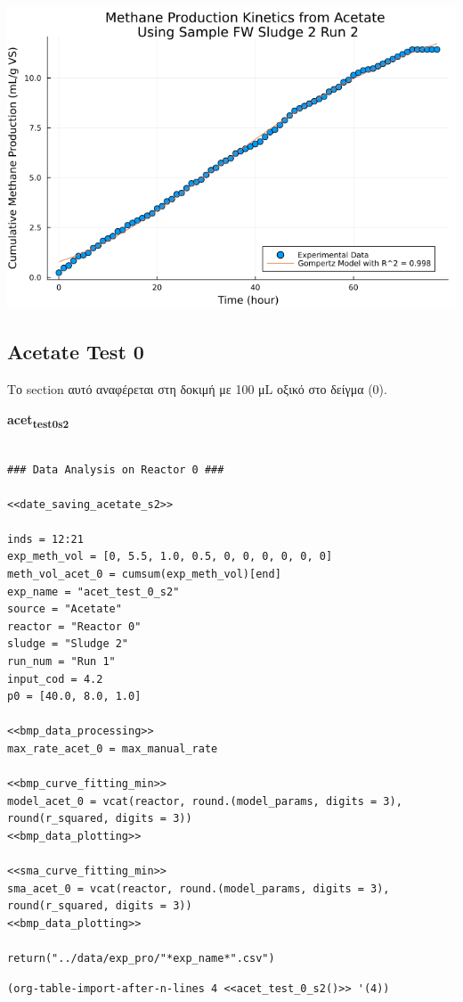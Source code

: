 \documentclass[11pt]{article}
\begin{document}
\begin{center}
\includegraphics[width=.9\linewidth]{../plots/BMPs/Acetate/specific_methane_kinetics_acet_test_fw_s2_2_hour.png}
\end{center}

\subsection{Acetate Test 0}
\label{sec:org07a0bc8}
Το section αυτό αναφέρεται στη δοκιμή με 100 μL οξικό στο δείγμα (0).

\textbf{acet\textsubscript{test}\textsubscript{0}\textsubscript{s2}}
\begin{verbatim}

### Data Analysis on Reactor 0 ###

<<date_saving_acetate_s2>>

inds = 12:21
exp_meth_vol = [0, 5.5, 1.0, 0.5, 0, 0, 0, 0, 0, 0]
meth_vol_acet_0 = cumsum(exp_meth_vol)[end]
exp_name = "acet_test_0_s2"
source = "Acetate"
reactor = "Reactor 0"
sludge = "Sludge 2"
run_num = "Run 1"
input_cod = 4.2
p0 = [40.0, 8.0, 1.0]

<<bmp_data_processing>>
max_rate_acet_0 = max_manual_rate

<<bmp_curve_fitting_min>>
model_acet_0 = vcat(reactor, round.(model_params, digits = 3), round(r_squared, digits = 3))
<<bmp_data_plotting>>

<<sma_curve_fitting_min>>
sma_acet_0 = vcat(reactor, round.(model_params, digits = 3), round(r_squared, digits = 3))  
<<bmp_data_plotting>>

return("../data/exp_pro/"*exp_name*".csv")
\end{verbatim}

\begin{verbatim}
(org-table-import-after-n-lines 4 <<acet_test_0_s2()>> '(4))
\end{verbatim}
\end{document}
